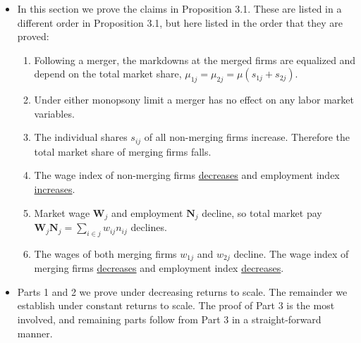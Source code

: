 \documentclass[12pt]{article}
\theoremstyle{prop}
\begin{document}
\begin{itemize}
	\item In this section we prove the claims in Proposition 3.1. These are
	listed in a different order in Proposition 3.1, but here listed in
	the order that they are proved:
	\begin{enumerate}
		\item Following a merger, the markdowns at the merged firms are equalized
		and depend on the total market share, $\mu_{1j}=\mu_{2j}=\mu\left(s_{1j}+s_{2j}\right)$.
		\item Under either monopsony limit a merger has no effect on any labor market
		variables.
		\item The individual shares $s_{ij}$ of all non-merging firms increase.
		Therefore the total market share of merging firms falls.
		\item The wage index of non-merging firms \uline{decreases} and employment
		index \uline{increases}.
		\item Market wage $\mathbf{W}_{j}$ and employment $\mathbf{N}_{j}$
		decline, so total market pay $\mathbf{W}_{j}\mathbf{N}_{j}=\sum_{i\in j}w_{ij}n_{ij}$
		declines.
		\item The wages of both merging firms $w_{1j}$ and $w_{2j}$ decline. The
		wage index of merging firms \uline{decreases} and employment index
		\uline{decreases}.
	\end{enumerate}
	\item Parts 1 and 2 we prove under decreasing returns to scale. The remainder
	we establish under constant returns to scale. The proof of Part 3
	is the most involved, and remaining parts follow from Part 3 in a
	straight-forward manner.
\end{itemize}

\bigskip
\end{document}
